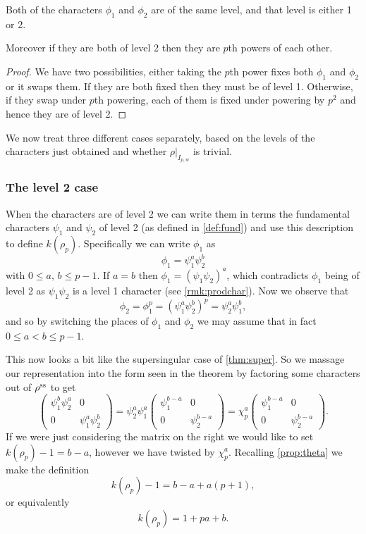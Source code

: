 \documentclass[a4paper,12pt]{article}
\begin{document}
\begin{prop}
Both of the characters $\phi_1$ and $\phi_2$ are of the same level, and that level is either 1 or 2.

Moreover if they are both of level 2 then they are $p$th powers of each other.
\end{prop}
\begin{proof}

We have two possibilities, either taking the $p$th power fixes both $\phi_1$ and $\phi_2$ or it swaps them.
If they are both fixed then they must be of level 1.
Otherwise, if they swap under $p$th powering, each of them is fixed under powering by $p^2$ and hence they are of level 2.
\end{proof}

We now treat three different cases separately, based on the levels of the characters just obtained and whether $\rho|_{I_{p,w}}$ is trivial.


\subsubsection{The level 2 case}\label{sec:l2}
When the characters are of level 2 we can write them in terms the fundamental characters $\psi_1$ and $\psi_2$ of level 2 (as defined in \cref{def:fund}) and use this description to define $k(\rho_p)$.
Specifically we can write $\phi_1$ as
\[
\phi_1 = \psi_1^a\psi_2^b
\]
with $0\le a,\,b\le p-1$.
If $a = b$ then $\phi_1 = (\psi_1 \psi_2)^a$, which contradicts $\phi_1$ being of level 2 as $\psi_1\psi_2$ is a level 1 character (see \cref{rmk:prodchar}).
Now we observe that
\[
\phi_2 = \phi_1^p = (\psi_1^a\psi_2^b)^p = \psi_2^a\psi_1^b,
\]
and so by switching the places of $\phi_1$ and $\phi_2$ we may assume that in fact $0\le a < b\le p-1$.

This now looks a bit like the supersingular case of \cref{thm:super}.
So we massage our representation into the form seen in the theorem by factoring some characters out of $\rho^\text{ss}$ to get
\[
\begin{pmatrix}
\psi_1^b\psi_2^a & 0 \\
0                & \psi_1^a\psi_2^b
\end{pmatrix} =
\psi_2^a\psi_1^a\begin{pmatrix}
\psi_1^{b-a} & 0 \\
0            & \psi_2^{b-a}
\end{pmatrix} =
\chi_p^a\begin{pmatrix}
\psi_1^{b-a} & 0 \\
0            & \psi_2^{b-a}
\end{pmatrix}.
\]
If we were just considering the matrix on the right we would like to set $k(\rho_p) - 1 = b - a$, however we have twisted by $\chi_p^a$.
Recalling \cref{prop:theta} we make the definition
\[
k(\rho_p) - 1 = b - a + a(p+1),
\]
or equivalently
\begin{equation}\label{eq:l2}
k(\rho_p) = 1 + pa + b.
\end{equation}
\end{document}
